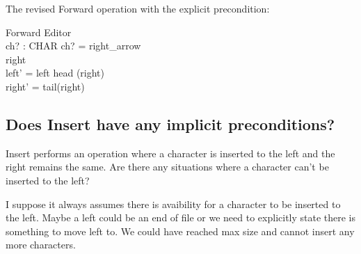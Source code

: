 \documentclass{article}
\begin{document}
The revised Forward operation with the explicit precondition:
\begin{schema}{Forward}
    \Delta Editor \\
    ch? : CHAR
    \where
    ch? = right\_arrow \\
    right \neq \langle \rangle \\
    left' = left \cat \langle head (right) \rangle \\
    right' = tail(right)
\end{schema}

\subsection{Does Insert have any implicit preconditions?}
Insert performs an operation where a character is inserted to the left and the right remains the same. Are there any situations where a character can't be inserted to the left?

I suppose it always assumes there is avaibility for a character to be inserted to the left. Maybe a left could be an end of file or we need to explicitly state there is something to move left to. We could have reached max size and cannot insert any more characters.
\end{document}
